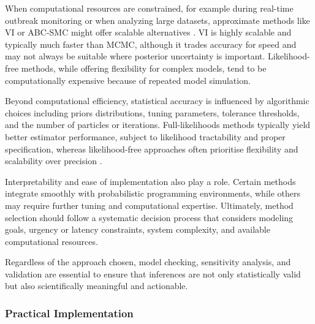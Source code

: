 \documentclass{article}
\begin{document}
When computational resources are constrained, for example during real-time outbreak monitoring or when analyzing large datasets, approximate methods like VI or ABC-SMC might offer scalable alternatives \citep{chatzilena2019contemporary, engebretsen2023real}. VI is highly scalable and typically much faster than MCMC, although it trades accuracy for speed and may not always be suitable where posterior uncertainty is important. Likelihood-free methods, while offering flexibility for complex models, tend to be computationally expensive because of repeated model simulation.

Beyond computational efficiency, statistical accuracy is influenced by algorithmic choices including priors distributions, tuning parameters, tolerance thresholds, and the number of particles or iterations. Full-likelihoods methods typically yield better estimator performance, subject to likelihood tractability and proper specification, whereas likelihood-free approaches often prioritise flexibility and scalability over precision \cite{alahmadi2020comparison}. 

Interpretability and ease of implementation also play a role. Certain methods integrate smoothly with probabilistic programming environments, while others may require further tuning and computational expertise. Ultimately, method selection should follow a systematic decision process that considers modeling goals, urgency or latency constraints, system complexity, and available computational resources. 

Regardless of the approach chosen, model checking, sensitivity analysis, and validation are essential to ensure that inferences are not only statistically valid but also scientifically meaningful and actionable.

\subsubsection{Practical Implementation}
\end{document}
